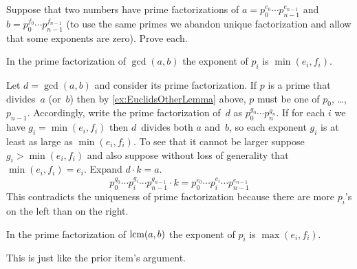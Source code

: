 \documentclass{ibl}  %
\begin{document}
\begin{problem}[\maxlength]
Suppose that two numbers have prime factorizations 
of $a=p_0^{e_0}\cdots p_{n-1}^{e_{n-1}}$
and $b=p_0^{f_0}\cdots p_{n-1}^{f_{n-1}}$
(to use the same primes we abandon unique factorization and 
allow that some exponents are zero).
Prove each.
\begin{exes}
\begin{exercise}
  In the prime factorization of
  $\gcd(a,b)$ the exponent of $p_i$ is $\min(e_i,f_i)$.
\end{exercise}
\begin{answer}
  Let $d=\gcd(a,b)$ and consider its prime factorization.
  If $p$ is a prime that divides~$a$ (or~$b$) then
  by \ref{ex:EuclidsOtherLemma} above, $p$ must be one of 
  $p_0$, \ldots, $p_{n-1}$.   
  Accordingly, 
  write the prime factorization of~$d$ as $p_0^{g_0}\cdots p_n^{g_n}$. 
  If for each $i$ we have $g_i=\min(e_i,f_i)$ then $d$~divides both $a$ and~$b$,
  so each exponent $g_i$ is at least as large as $\min(e_i,f_i)$.
  To see that it cannot be larger suppose $g_i>\min(e_i,f_i)$
  and also suppose without loss of generality that $\min(e_i,f_i)=e_i$.
  Expand
  $d\cdot k=a$.
  \begin{equation*}
    p_0^{g_0}\cdots p_i^{g_i}\cdots p_{n-1}^{g_{n-1}}\cdot k
       =p_0^{e_0}\cdots p_i^{e_i}\cdots p_{n-1}^{e_{n-1}}
  \end{equation*}
  This contradicts the uniqueness of prime factorization
  because there are more 
  $p_i$'s on the left than on the right.  
\end{answer}
\begin{exercise} 
  In the prime factorization of $\operatorname{lcm}(a,b)$ the exponent of 
  $p_i$ is $\max(e_i,f_i)$.
\end{exercise}
\begin{answer}
  This is just like the prior item's argument.    
\end{answer}
\end{exes}
\end{problem}
\end{document}
